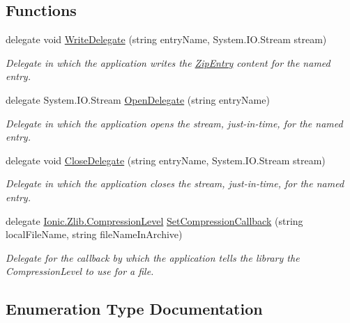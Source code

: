 \subsection*{Functions}
\begin{DoxyCompactItemize}
\item 
delegate void \mbox{\hyperlink{namespace_super_tiled2_unity_1_1_ionic_1_1_zip_aa3bc35e889c4343c0028b310499c6886}{Write\+Delegate}} (string entry\+Name, System.\+I\+O.\+Stream stream)
\begin{DoxyCompactList}\small\item\em Delegate in which the application writes the {\ttfamily \mbox{\hyperlink{class_super_tiled2_unity_1_1_ionic_1_1_zip_1_1_zip_entry}{Zip\+Entry}}} content for the named entry. \end{DoxyCompactList}\item 
delegate System.\+I\+O.\+Stream \mbox{\hyperlink{namespace_super_tiled2_unity_1_1_ionic_1_1_zip_a02583f9b7b1b724562c5ead6715256f2}{Open\+Delegate}} (string entry\+Name)
\begin{DoxyCompactList}\small\item\em Delegate in which the application opens the stream, just-\/in-\/time, for the named entry. \end{DoxyCompactList}\item 
delegate void \mbox{\hyperlink{namespace_super_tiled2_unity_1_1_ionic_1_1_zip_a19b625523fef0bcff4722ebb8a04b5d0}{Close\+Delegate}} (string entry\+Name, System.\+I\+O.\+Stream stream)
\begin{DoxyCompactList}\small\item\em Delegate in which the application closes the stream, just-\/in-\/time, for the named entry. \end{DoxyCompactList}\item 
delegate \mbox{\hyperlink{namespace_super_tiled2_unity_1_1_ionic_1_1_zlib_a20f6771804996c363f454ad9765cd7db}{Ionic.\+Zlib.\+Compression\+Level}} \mbox{\hyperlink{namespace_super_tiled2_unity_1_1_ionic_1_1_zip_ab6b15a72531220e6f98c46b594c9a849}{Set\+Compression\+Callback}} (string local\+File\+Name, string file\+Name\+In\+Archive)
\begin{DoxyCompactList}\small\item\em Delegate for the callback by which the application tells the library the Compression\+Level to use for a file. \end{DoxyCompactList}\end{DoxyCompactItemize}


\subsection{Enumeration Type Documentation}
\mbox{\label{namespace_super_tiled2_unity_1_1_ionic_1_1_zip_a48fd7a4529dd87fb2fda54f62ae3d8a3}} 

